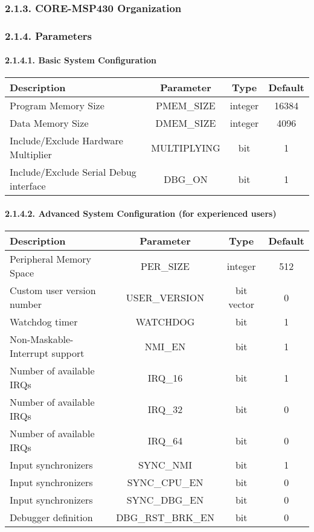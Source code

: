 \documentclass[]{article}
\let\oldparagraph\paragraph
\renewcommand{\paragraph}[1]{\oldparagraph{#1}\mbox{}}
\begin{document}
\hypertarget{core-msp430-organization}{%
\subsubsection{2.1.3. CORE-MSP430
Organization}\label{core-msp430-organization}}

\hypertarget{parameters}{%
\subsubsection{2.1.4. Parameters}\label{parameters}}

\hypertarget{basic-system-configuration}{%
\paragraph{2.1.4.1. Basic System
Configuration}\label{basic-system-configuration}}

\begin{longtable}[]{@{}lccc@{}}
\toprule
Description & Parameter & Type & Default\tabularnewline
\midrule
\endhead
Program Memory Size & PMEM\_SIZE & integer & 16384\tabularnewline
Data Memory Size & DMEM\_SIZE & integer & 4096\tabularnewline
Include/Exclude Hardware Multiplier & MULTIPLYING & bit &
1\tabularnewline
Include/Exclude Serial Debug interface & DBG\_ON & bit &
1\tabularnewline
\bottomrule
\end{longtable}

\hypertarget{advanced-system-configuration-for-experienced-users}{%
\paragraph{2.1.4.2. Advanced System Configuration (for experienced
users)}\label{advanced-system-configuration-for-experienced-users}}

\begin{longtable}[]{@{}lccc@{}}
\toprule
Description & Parameter & Type & Default\tabularnewline
\midrule
\endhead
Peripheral Memory Space & PER\_SIZE & integer & 512\tabularnewline
Custom user version number & USER\_VERSION & bit vector &
0\tabularnewline
Watchdog timer & WATCHDOG & bit & 1\tabularnewline
Non-Maskable-Interrupt support & NMI\_EN & bit & 1\tabularnewline
Number of available IRQs & IRQ\_16 & bit & 1\tabularnewline
Number of available IRQs & IRQ\_32 & bit & 0\tabularnewline
Number of available IRQs & IRQ\_64 & bit & 0\tabularnewline
Input synchronizers & SYNC\_NMI & bit & 1\tabularnewline
Input synchronizers & SYNC\_CPU\_EN & bit & 0\tabularnewline
Input synchronizers & SYNC\_DBG\_EN & bit & 0\tabularnewline
Debugger definition & DBG\_RST\_BRK\_EN & bit & 0\tabularnewline
\bottomrule
\end{longtable}
\end{document}
